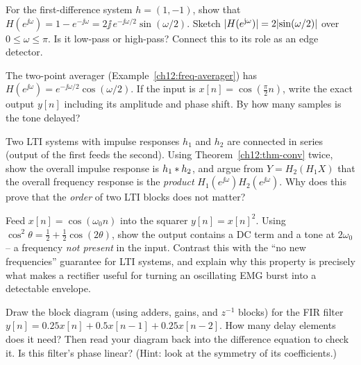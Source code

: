 \begin{exercise}
For the first-difference system $h=(1,-1)$, show that
$H(e^{\jj\omega})=1-e^{-\jj\omega}=2\jj\,e^{-\jj\omega/2}\sin(\omega/2)$. Sketch
$\lvert H(e^{\mathrm{j}\omega})\rvert=2\lvert\sin(\omega/2)\rvert$ over $0\le\omega\le\pi$. Is it
low-pass or high-pass? Connect this to its role as an edge detector.
\end{exercise}

\begin{exercise}
The two-point averager (Example~\ref{ch12:freq-averager}) has
$H(e^{\jj\omega})=e^{-\jj\omega/2}\cos(\omega/2)$. If the input is
$x[n]=\cos(\tfrac{\pi}{2}n)$, write the exact output $y[n]$ including its
amplitude and phase shift. By how many samples is the tone delayed?
\end{exercise}

\begin{exercise}
Two LTI systems with impulse responses $h_1$ and $h_2$ are connected in series
(output of the first feeds the second). Using Theorem~\ref{ch12:thm-conv} twice,
show the overall impulse response is $h_1\ast h_2$, and argue from
$Y=H_2(H_1 X)$ that the overall frequency response is the \emph{product}
$H_1(e^{\jj\omega})H_2(e^{\jj\omega})$. Why does this prove that the \emph{order}
of two LTI blocks does not matter?
\end{exercise}

\begin{exercise}
Feed $x[n]=\cos(\omega_0 n)$ into the squarer $y[n]=x[n]^2$. Using
$\cos^2\theta=\tfrac12+\tfrac12\cos(2\theta)$, show the output contains a DC term
and a tone at $2\omega_0$ -- a frequency \emph{not present} in the input.
Contrast this with the ``no new frequencies'' guarantee for LTI systems, and
explain why this property is precisely what makes a rectifier useful for turning
an oscillating EMG burst into a detectable envelope.
\end{exercise}

\begin{exercise}
Draw the block diagram (using adders, gains, and $z^{-1}$ blocks) for the FIR
filter $y[n]=0.25x[n]+0.5x[n-1]+0.25x[n-2]$. How many delay elements does it
need? Then read your diagram back into the difference equation to check it. Is
this filter's phase linear? (Hint: look at the symmetry of its coefficients.)
\end{exercise}
